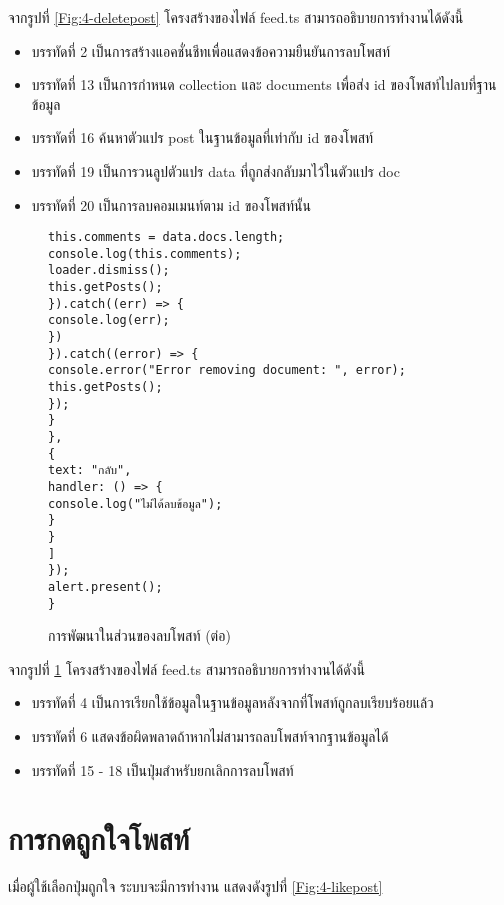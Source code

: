 จากรูปที่ \ref{Fig:4-deletepost} โครงสร้างของไฟล์ feed.ts สามารถอธิบายการทำงานได้ดังนี้
\begin{itemize}[label={--}]
\item บรรทัดที่ 2 เป็นการสร้างแอคชั่นชีทเพื่อแสดงข้อความยืนยันการลบโพสท์
\item บรรทัดที่ 13 เป็นการกำหนด collection และ documents เพื่อส่ง id ของโพสท์ไปลบที่ฐานข้อมูล
\item บรรทัดที่ 16 ค้นหาตัวแปร post ในฐานข้อมูลที่เท่ากับ id ของโพสท์
\item บรรทัดที่ 19 เป็นการวนลูปตัวแปร data ที่ถูกส่งกลับมาไว้ในตัวแปร doc
\item บรรทัดที่ 20 เป็นการลบคอมเมนท์ตาม id ของโพสท์นั้น
\end{itemize}
\newpage



\begin{figure}[H]
	{\lstset{language=Pascal}
	\begin{lstlisting}
this.comments = data.docs.length;
console.log(this.comments);
loader.dismiss();
this.getPosts();
}).catch((err) => {
console.log(err);
})
}).catch((error) => {
console.error("Error removing document: ", error);
this.getPosts();
});
}
},
{
text: "กลับ",
handler: () => {
console.log("ไม่ได้ลบข้อมูล");
}
}
]
});
alert.present();
}
	\end{lstlisting}}
	\caption{การพัฒนาในส่วนของลบโพสท์ (ต่อ)}
	\label{Fig:4-deletepostcon1}
	\end{figure}
	
	จากรูปที่ \ref{Fig:4-deletepostcon1} โครงสร้างของไฟล์ feed.ts สามารถอธิบายการทำงานได้ดังนี้
	\begin{itemize}[label={--}]
	\item บรรทัดที่ 4 เป็นการเรียกใช้ข้อมูลในฐานข้อมูลหลังจากที่โพสท์ถูกลบเรียบร้อยแล้ว
	\item บรรทัดที่ 6 แสดงข้อผิดพลาดถ้าหากไม่สามารถลบโพสท์จากฐานข้อมูลได้
	\item บรรทัดที่ 15 - 18 เป็นปุ่มสำหรับยกเลิกการลบโพสท์
	\end{itemize}
	\newpage
	


\section{การกดถูกใจโพสท์}
เมื่อผู้ใช้เลือกปุ่มถูกใจ ระบบจะมีการทำงาน แสดงดังรูปที่ \ref{Fig:4-likepost}

